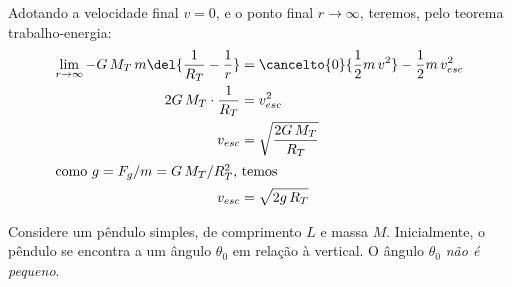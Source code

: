 \documentclass[]{IMTexam}
\begin{document}
\begin{questions}
\begin{solution}
\begin{multi}[2][t]
			\nextcol

			Adotando a velocidade final $ v=0 $, e o ponto final $ r\to\infty $, teremos, pelo teorema trabalho-energia:
			\begin{align*}
				\lim\limits_{r\to\infty}-G\,M_T\,m\del{\dfrac{1}{R_T}-\dfrac{1}{r}} & =\cancelto{0}{\dfrac{1}{2}m\,v^{2}}-\dfrac{1}{2}m\,v_{esc}^{2} \\
				2G\,M_T\cdot\dfrac{1}{R_T}                                          & =v_{esc}^{2}                                                   \\
				v_{esc}                                                             & =\sqrt{\dfrac{2G\,M_T}{R_T}}                                   \\
				\intertext{como $ g=F_g/m=G\,M_T/R_T^{2} $, temos}
				v_{esc}                                                             & =\sqrt{2g\,R_T}
			\end{align*}
		\end{multi}


	\end{solution}

	\clearpage

	\question Considere um pêndulo simples, de comprimento $ L $ e massa $ M $. Inicialmente, o pêndulo se encontra a um ângulo $ \theta_0 $ em relação à vertical. O ângulo $ \theta_0 $ \textit{não é pequeno}.

\end{questions}
\end{document}

